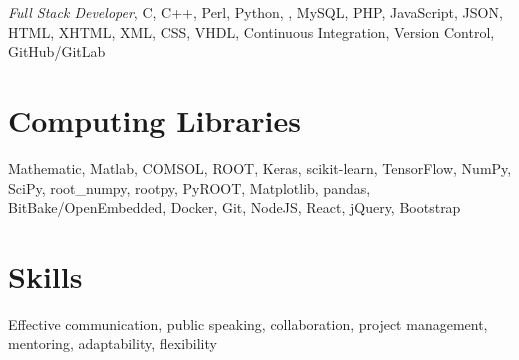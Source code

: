 \documentclass[margin,line]{resume}
\let\origsection\section%
\let\section\subsection%
\let\section\origsection%
\begin{document}
\begin{resume}
\textsl{Full Stack Developer}, C, C++, Perl, Python, \LaTeXe, MySQL, PHP, JavaScript, JSON, HTML, XHTML, XML, CSS, VHDL, Continuous Integration, Version Control, GitHub/GitLab

\section{\mysidestyle Computing Libraries}

Mathematic, Matlab, COMSOL, ROOT, Keras, scikit-learn, TensorFlow, NumPy, SciPy, root\_numpy, rootpy, PyROOT, Matplotlib, pandas, BitBake/OpenEmbedded, Docker, Git, NodeJS, React, jQuery, Bootstrap

\section{\mysidestyle Skills}

Effective communication, public speaking, collaboration, project management, mentoring, adaptability, flexibility

%
%
\end{resume}
\end{document}
